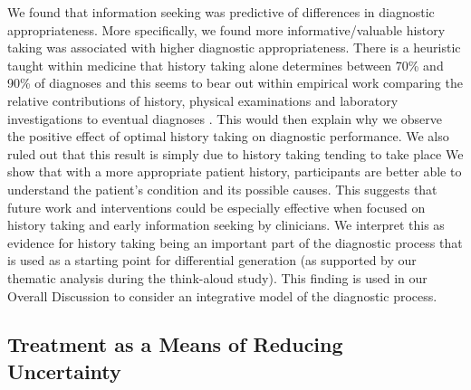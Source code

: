 \documentclass[a4paper, nobind]{templates/ociamthesis}
\begin{document}
We found that information seeking was predictive of differences in diagnostic appropriateness. More specifically, we found more informative/valuable history taking was associated with higher diagnostic appropriateness. There is a heuristic taught within medicine that history taking alone determines between 70\% and 90\% of diagnoses \autocite{keifenheim_teaching_2015} and this seems to bear out within empirical work comparing the relative contributions of history, physical examinations and laboratory investigations to eventual diagnoses \autocite{hampton_relative_1975,peterson_contributions_1992,tsukamoto_contribution_2012}. This would then explain why we observe the positive effect of optimal history taking on diagnostic performance. We also ruled out that this result is simply due to history taking tending to take place We show that with a more appropriate patient history, participants are better able to understand the patient's condition and its possible causes. This suggests that future work and interventions could be especially effective when focused on history taking and early information seeking by clinicians. We interpret this as evidence for history taking being an important part of the diagnostic process \autocite{tio_effect_2022} that is used as a starting point for differential generation (as supported by our thematic analysis during the think-aloud study). This finding is used in our Overall Discussion to consider an integrative model of the diagnostic process.

\subsection{Treatment as a Means of Reducing Uncertainty}\label{treatment-as-a-means-of-reducing-uncertainty}
\end{document}
